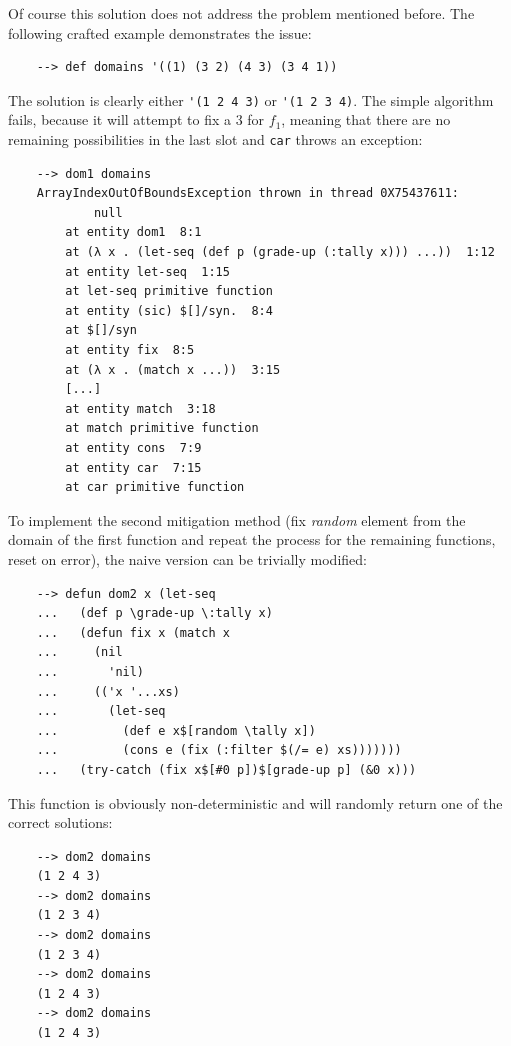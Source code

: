 Of course this solution does not address the problem mentioned before. The following crafted example demonstrates the issue:

\begin{Verbatim}
    --> def domains '((1) (3 2) (4 3) (3 4 1))
\end{Verbatim}

The solution is clearly either \verb|'(1 2 4 3)| or \verb|'(1 2 3 4)|. The simple algorithm fails, because it will attempt to fix a $3$ for $f_1$, meaning that there are no remaining possibilities in the last slot and \verb|car| throws an exception:

\begin{Verbatim}
    --> dom1 domains
    ArrayIndexOutOfBoundsException thrown in thread 0X75437611:
            null
        at entity dom1  8:1
        at (λ x . (let-seq (def p (grade-up (:tally x))) ...))  1:12
        at entity let-seq  1:15
        at let-seq primitive function
        at entity (sic) $[]/syn.  8:4
        at $[]/syn
        at entity fix  8:5
        at (λ x . (match x ...))  3:15
        [...]
        at entity match  3:18
        at match primitive function
        at entity cons  7:9
        at entity car  7:15
        at car primitive function
\end{Verbatim}

To implement the second mitigation method (fix \textit{random} element from the domain of the first function and repeat the process for the remaining functions, reset on error), the naive version can be trivially modified:

\begin{Verbatim}
    --> defun dom2 x (let-seq
    ...   (def p \grade-up \:tally x)
    ...   (defun fix x (match x
    ...     (nil
    ...       'nil)
    ...     (('x '...xs)
    ...       (let-seq
    ...         (def e x$[random \tally x])
    ...         (cons e (fix (:filter $(/= e) xs)))))))
    ...   (try-catch (fix x$[#0 p])$[grade-up p] (&0 x)))
\end{Verbatim}

This function is obviously non-deterministic and will randomly return one of the correct solutions:

\begin{Verbatim}
    --> dom2 domains
    (1 2 4 3)
    --> dom2 domains
    (1 2 3 4)
    --> dom2 domains
    (1 2 3 4)
    --> dom2 domains
    (1 2 4 3)
    --> dom2 domains
    (1 2 4 3)
\end{Verbatim}

